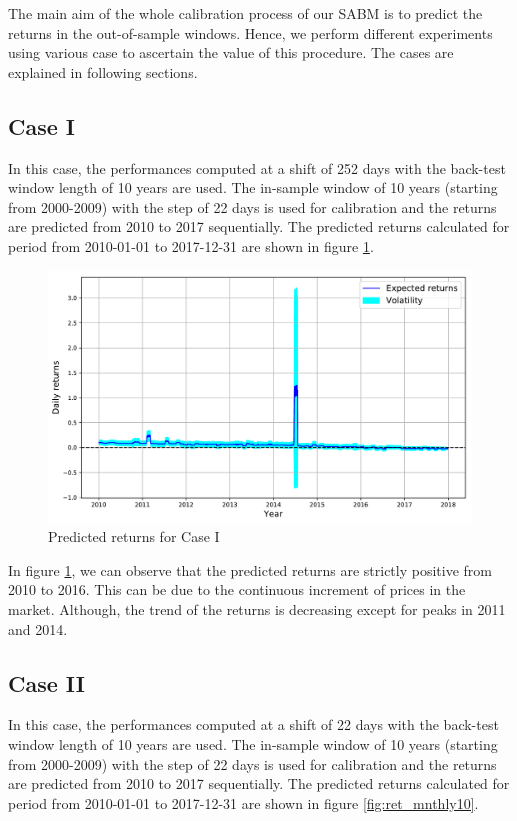 The main aim of the whole calibration process of our SABM is to predict the returns in the out-of-sample windows. Hence, we perform different experiments using various case to ascertain the value of this procedure. The cases are explained in following sections.


\subsection{Case I}
In this case, the performances computed at a shift of 252 days with the back-test window length of 10 years are used. The in-sample window of 10 years (starting from 2000-2009) with the step of 22 days is used for calibration and the returns are predicted from 2010 to 2017 sequentially. The predicted returns calculated for period from 2010-01-01 to 2017-12-31 are shown in figure \ref{fig:ret_yrly}.

\begin{figure}[h!] 
\centering
 \includegraphics[width=0.75\linewidth]{figures/exp_ret_yearly.pdf}
\caption{Predicted returns for Case I}
\label{fig:ret_yrly}
\end{figure}  

In figure \ref{fig:ret_yrly}, we can observe that the predicted returns are strictly positive from 2010 to 2016. This can be due to the continuous increment of prices in the market. Although, the trend of the returns is decreasing except for peaks in 2011 and 2014. 


\subsection{Case II}
In this case, the performances computed at a shift of 22 days with the back-test window length of 10 years are used. The in-sample window of 10 years (starting from 2000-2009) with the step of 22 days is used for calibration and the returns are predicted from 2010 to 2017 sequentially. The predicted returns calculated for period from 2010-01-01 to 2017-12-31 are shown in figure \ref{fig:ret_mnthly10}.

